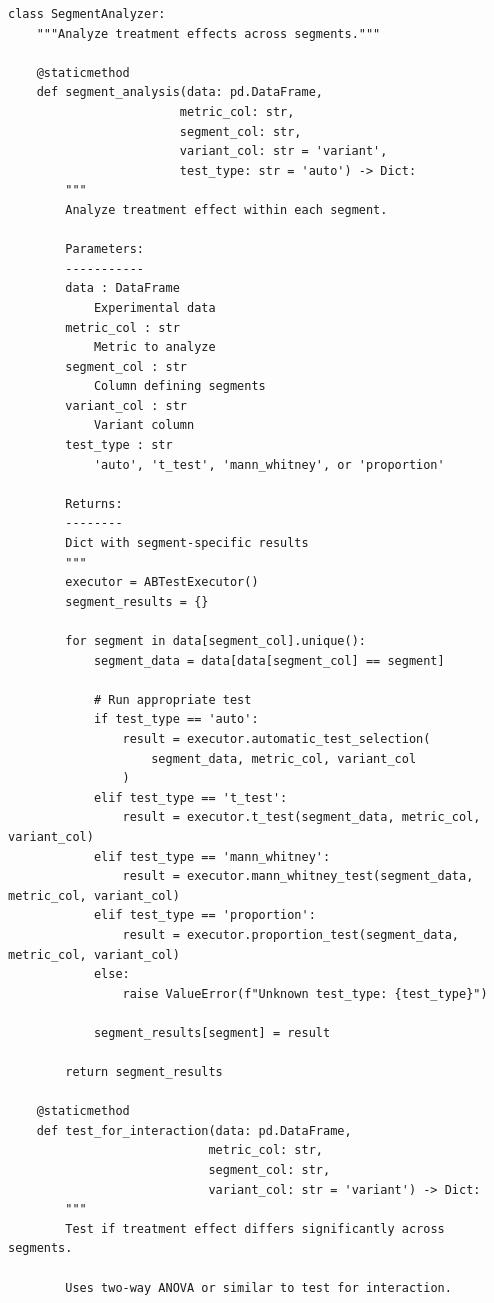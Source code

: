 \lstset{language=Python, caption=Segment Analysis Framework}
\begin{lstlisting}
class SegmentAnalyzer:
    """Analyze treatment effects across segments."""

    @staticmethod
    def segment_analysis(data: pd.DataFrame,
                        metric_col: str,
                        segment_col: str,
                        variant_col: str = 'variant',
                        test_type: str = 'auto') -> Dict:
        """
        Analyze treatment effect within each segment.

        Parameters:
        -----------
        data : DataFrame
            Experimental data
        metric_col : str
            Metric to analyze
        segment_col : str
            Column defining segments
        variant_col : str
            Variant column
        test_type : str
            'auto', 't_test', 'mann_whitney', or 'proportion'

        Returns:
        --------
        Dict with segment-specific results
        """
        executor = ABTestExecutor()
        segment_results = {}

        for segment in data[segment_col].unique():
            segment_data = data[data[segment_col] == segment]

            # Run appropriate test
            if test_type == 'auto':
                result = executor.automatic_test_selection(
                    segment_data, metric_col, variant_col
                )
            elif test_type == 't_test':
                result = executor.t_test(segment_data, metric_col, variant_col)
            elif test_type == 'mann_whitney':
                result = executor.mann_whitney_test(segment_data, metric_col, variant_col)
            elif test_type == 'proportion':
                result = executor.proportion_test(segment_data, metric_col, variant_col)
            else:
                raise ValueError(f"Unknown test_type: {test_type}")

            segment_results[segment] = result

        return segment_results

    @staticmethod
    def test_for_interaction(data: pd.DataFrame,
                            metric_col: str,
                            segment_col: str,
                            variant_col: str = 'variant') -> Dict:
        """
        Test if treatment effect differs significantly across segments.

        Uses two-way ANOVA or similar to test for interaction.


\end{lstlisting}
